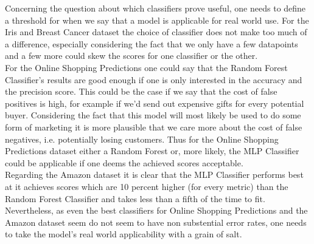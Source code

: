 Concerning the question about which classifiers prove useful, one needs to define a threshold for when we say that a model is applicable for real world use. For the Iris and Breast Cancer dataset the choice of classifier does not make too much of a difference, especially considering the fact that we only have a few datapoints and a few more could skew the scores for one classifier or the other. \\
For the Online Shopping Predictions one could say that the Random Forest Classifier's results are good enough if one is only interested in the accuracy and the precision score. This could be the case if we say that the cost of false positives is high, for example if we'd send out expensive gifts for every potential buyer. Considering the fact that this model will most likely be used to do some form of marketing it is more plausible that we care more about the cost of false negatives, i.e. potentially losing customers. Thus for the Online Shopping Predictions dataset either a Random Forest or, more likely, the MLP Classifier could be applicable if one deems the achieved scores acceptable. \\
Regarding the Amazon dataset it is clear that the MLP Classifier performs best at it achieves scores which are 10 percent higher (for every metric) than the Random Forest Classifier and takes less than a fifth of the time to fit. Nevertheless, as even the best classifiers for Online Shopping Predictions and the Amazon dataset seem do not seem to have non substential error rates, one needs to take the model's real world applicability with a grain of salt. \\
\newline


